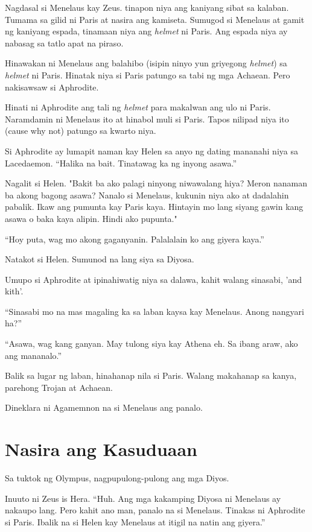 \documentclass[12pt,letterpaper]{report}
\begin{document}
Nagdasal si Menelaus kay Zeus. tinapon niya ang kaniyang sibat sa kalaban. Tumama sa gilid ni Paris at nasira ang kamiseta. Sumugod si Menelaus at gamit ng kaniyang espada, tinamaan niya ang \textit{helmet} ni Paris. Ang espada niya ay nabasag sa tatlo apat na piraso.

Hinawakan ni Menelaus ang balahibo (isipin ninyo yun griyegong \textit{helmet}) sa \textit{helmet} ni Paris. Hinatak niya si Paris patungo sa tabi ng mga Achaean. Pero nakisawsaw si Aphrodite.

Hinati ni Aphrodite ang tali ng \textit{helmet} para makalwan ang ulo ni Paris. Naramdamin ni Menelaus ito at hinabol muli si Paris. Tapos nilipad niya ito (cause why not) patungo sa kwarto niya.

Si Aphrodite ay lumapit naman kay Helen sa anyo ng dating mananahi niya sa Lacedaemon. ``Halika na bait. Tinatawag ka ng inyong asawa.''

Nagalit si Helen. "Bakit ba ako palagi ninyong niwawalang hiya? Meron nanaman ba akong bagong asawa?
Nanalo si Menelaus, kukunin niya ako at dadalahin pabalik. Ikaw ang pumunta kay Paris kaya. Hintayin mo lang siyang gawin kang asawa o baka kaya alipin. Hindi ako pupunta."

``Hoy puta, wag mo akong gaganyanin. Palalalain ko ang giyera kaya.''

Natakot si Helen. Sumunod na lang siya sa Diyosa.

Umupo si Aphrodite at ipinahiwatig niya sa dalawa, kahit walang sinasabi, 'and kith'.

``Sinasabi mo na mas magaling ka sa laban kaysa kay Menelaus. Anong nangyari ha?''

``Asawa, wag kang ganyan. May tulong siya kay Athena eh. Sa ibang araw, ako ang mananalo.''

Balik sa lugar ng laban, hinahanap nila si Paris. Walang makahanap sa kanya, parehong Trojan at Achaean.

Dineklara ni Agamemnon na si Menelaus ang panalo.


\pagebreak
\chapter{Nasira ang Kasuduaan}
Sa tuktok ng Olympus, nagpupulong-pulong ang mga Diyos.

Inuuto ni Zeus is Hera. ``Huh. Ang mga kakamping Diyosa ni Menelaus ay nakaupo lang. Pero kahit ano man, panalo na si Menelaus. Tinakas ni Aphrodite si Paris. Ibalik na si Helen kay Menelaus at itigil na natin ang giyera.''
\end{document}
